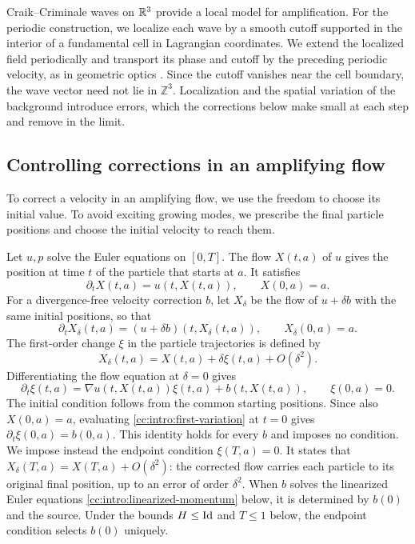 Craik--Criminale waves on $\mathbb R^3$ provide a local model for amplification.
For the periodic construction, we localize each wave by a smooth cutoff
supported in the interior of a fundamental cell in Lagrangian
coordinates. We extend the localized field periodically and transport its
phase and cutoff by the preceding periodic velocity, as in geometric optics
\cite{LifschitzHameiri1991,FriedlanderVishik1991,Lax1957,ChoquetBruhat1969}.
Since the cutoff
vanishes near the cell boundary, the wave vector need not lie
in $\mathbb Z^3$. Localization and the spatial variation of the background
introduce errors, which the corrections below make small at each step
and remove in the limit.

\subsection{Controlling corrections in an amplifying flow}
To correct a velocity in an amplifying flow, we use the freedom to choose
its initial value. To avoid exciting growing modes, we prescribe the final
particle positions and choose the initial velocity to reach them.

Let $u,p$ solve the Euler equations on $[0,T]$. The flow $X(t,a)$ of
$u$ gives the position at time $t$ of the particle that starts at $a$.
It satisfies
\[
 \partial_tX(t,a)=u(t,X(t,a)),\qquad X(0,a)=a.
\]
For a divergence-free velocity correction $b$, let $X_\delta$ be the
flow of $u+\delta b$ with the same initial positions, so that
\[
 \partial_tX_\delta(t,a)
       =(u+\delta b)(t,X_\delta(t,a)),\qquad X_\delta(0,a)=a.
\]
The first-order change $\xi$ in the particle trajectories is defined by
\[
 X_\delta(t,a)=X(t,a)+\delta\xi(t,a)+O(\delta^2).
\]
Differentiating the flow equation at $\delta=0$ gives
\begin{equation}\label{cc:intro:first-variation}
 \partial_t\xi(t,a)=\nabla u(t,X(t,a))\xi(t,a)+b(t,X(t,a)),
 \qquad \xi(0,a)=0.
\end{equation}
The initial condition follows from the common starting positions.
Since also $X(0,a)=a$, evaluating \eqref{cc:intro:first-variation} at
$t=0$ gives $\partial_t\xi(0,a)=b(0,a)$. This identity holds for every
$b$ and imposes no condition. We impose instead the endpoint condition
$\xi(T,a)=0$. It states that $X_\delta(T,a)=X(T,a)+O(\delta^2)$: the
corrected flow carries each particle to its original final position,
up to an error of order $\delta^2$. When $b$ solves the linearized
Euler equations \eqref{cc:intro:linearized-momentum} below, it is
determined by $b(0)$ and the source. Under the bounds $H\le\operatorname{Id}$ and
$T\le1$ below, the endpoint condition selects $b(0)$ uniquely.

